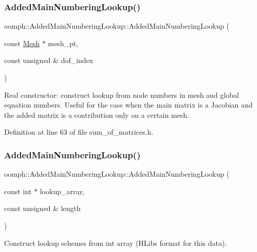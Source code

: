 \subsubsection{\texorpdfstring{Added\+Main\+Numbering\+Lookup()}{AddedMainNumberingLookup()}\hspace{0.1cm}{\footnotesize\ttfamily [2/4]}}
{\footnotesize\ttfamily oomph\+::\+Added\+Main\+Numbering\+Lookup\+::\+Added\+Main\+Numbering\+Lookup (\begin{DoxyParamCaption}\item[{const \hyperlink{classoomph_1_1Mesh}{Mesh} $\ast$}]{mesh\+\_\+pt,  }\item[{const unsigned \&}]{dof\+\_\+index }\end{DoxyParamCaption})\hspace{0.3cm}{\ttfamily [inline]}}

Real constructor\+: construct lookup from node numbers in mesh and global equation numbers. Useful for the case when the main matrix is a Jacobian and the added matrix is a contribution only on a certain mesh. 

Definition at line 63 of file sum\+\_\+of\+\_\+matrices.\+h.

\mbox{\label{classoomph_1_1AddedMainNumberingLookup_a643646f38ca0d58f7e1ed32c06a18aa8}} 
\subsubsection{\texorpdfstring{Added\+Main\+Numbering\+Lookup()}{AddedMainNumberingLookup()}\hspace{0.1cm}{\footnotesize\ttfamily [3/4]}}
{\footnotesize\ttfamily oomph\+::\+Added\+Main\+Numbering\+Lookup\+::\+Added\+Main\+Numbering\+Lookup (\begin{DoxyParamCaption}\item[{const int $\ast$}]{lookup\+\_\+array,  }\item[{const unsigned \&}]{length }\end{DoxyParamCaption})\hspace{0.3cm}{\ttfamily [inline]}}

Construct lookup schemes from int array (H\+Lib\textquotesingle{}s format for this data). 

